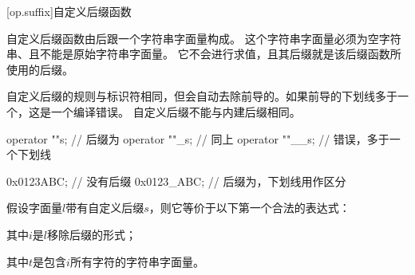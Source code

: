 [op.suffix]{自定义后缀函数}

\pnum
自定义后缀函数由后跟一个字符串字面量构成。
这个字符串字面量必须为空字符串、且不能是原始字符串字面量。
它不会进行求值，且其后缀就是该后缀函数所使用的后缀。

\pnum
自定义后缀的规则与标识符相同，但会自动去除前导的\tcode{_}。如果前导的下划线多于一个，这是一个编译错误。
自定义后缀不能与内建后缀相同。

\enterexample
\begin{codeblock}
operator ""s; // 后缀为
operator ""_s; // 同上
operator ""__s; // 错误，多于一个下划线

0x0123ABC; // 没有后缀
0x0123_ABC; // 后缀为，下划线用作区分
\end{codeblock}
\exitexample

\pnum
假设字面量$l$带有自定义后缀$s$，则它等价于以下第一个合法的表达式：
\begin{codeblock}
    operator ""\{$s$}(\{$i$})
\end{codeblock}
其中$i$是$l$移除后缀的形式；
\begin{codeblock}
    operator ""\{$s$}(\{$t$})
\end{codeblock}
其中$t$是包含$i$所有字符的字符串字面量。